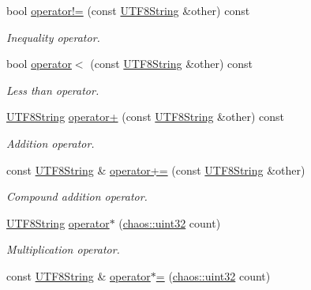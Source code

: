 \begin{DoxyCompactItemize}
bool \hyperlink{classchaos_1_1str_1_1_u_t_f8_string_a166394399a4d200494b40e034aa330da}{operator!=} (const \hyperlink{classchaos_1_1str_1_1_u_t_f8_string}{U\+T\+F8\+String} \&other) const 
\begin{DoxyCompactList}\small\item\em Inequality operator. \end{DoxyCompactList}\item 
bool \hyperlink{classchaos_1_1str_1_1_u_t_f8_string_ac7b54ed9c42a9c9a0a386d453d2c1daa}{operator$<$} (const \hyperlink{classchaos_1_1str_1_1_u_t_f8_string}{U\+T\+F8\+String} \&other) const 
\begin{DoxyCompactList}\small\item\em Less than operator. \end{DoxyCompactList}\item 
\hyperlink{classchaos_1_1str_1_1_u_t_f8_string}{U\+T\+F8\+String} \hyperlink{classchaos_1_1str_1_1_u_t_f8_string_a0d624a8e308b9a04511d31558ae37d8d}{operator+} (const \hyperlink{classchaos_1_1str_1_1_u_t_f8_string}{U\+T\+F8\+String} \&other) const 
\begin{DoxyCompactList}\small\item\em Addition operator. \end{DoxyCompactList}\item 
const \hyperlink{classchaos_1_1str_1_1_u_t_f8_string}{U\+T\+F8\+String} \& \hyperlink{classchaos_1_1str_1_1_u_t_f8_string_a9ce7f005abc581590ff3823db749873f}{operator+=} (const \hyperlink{classchaos_1_1str_1_1_u_t_f8_string}{U\+T\+F8\+String} \&other)
\begin{DoxyCompactList}\small\item\em Compound addition operator. \end{DoxyCompactList}\item 
\hyperlink{classchaos_1_1str_1_1_u_t_f8_string}{U\+T\+F8\+String} \hyperlink{classchaos_1_1str_1_1_u_t_f8_string_a8b6c57015a5e29083c74da682bc4ddac}{operator$\ast$} (\hyperlink{namespacechaos_a3b3a47ba1e284655bf1a30c441121c60}{chaos\+::uint32} count)
\begin{DoxyCompactList}\small\item\em Multiplication operator. \end{DoxyCompactList}\item 
const \hyperlink{classchaos_1_1str_1_1_u_t_f8_string}{U\+T\+F8\+String} \& \hyperlink{classchaos_1_1str_1_1_u_t_f8_string_a653dcbb095d2db19042807d03372dfbd}{operator$\ast$=} (\hyperlink{namespacechaos_a3b3a47ba1e284655bf1a30c441121c60}{chaos\+::uint32} count)

\end{DoxyCompactItemize}
